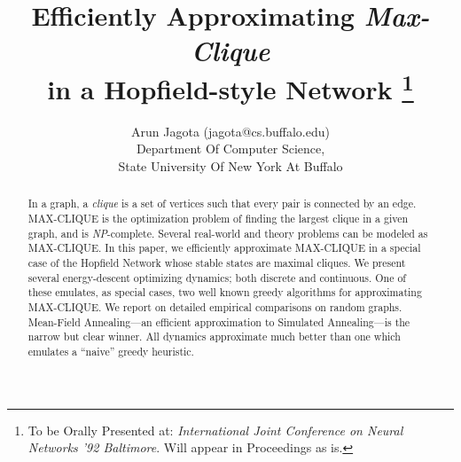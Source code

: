 \topmargin -1.0in
\textheight 9.7in
\textwidth 7.0in
\hoffset -1.0in
\title{\bf Efficiently Approximating {\em Max-Clique} \\ 
in a Hopfield-style Network 
\footnote{To be Orally Presented at: {\em International Joint Conference on Neural Networks '92 Baltimore}. Will appear in Proceedings as is.}
}
\author{Arun Jagota (jagota@cs.buffalo.edu)\\ 
Department Of Computer Science,\\
State University Of New York At Buffalo 
}
\date{}

\maketitle
\begin{abstract}
In a graph, a {\em clique} is a set of vertices such that every pair
is connected by an edge. MAX-CLIQUE is the optimization problem of 
finding the largest clique in a given graph, and is {\em NP}-complete.
Several real-world and theory problems can be modeled as MAX-CLIQUE.
In this paper, we efficiently approximate MAX-CLIQUE in a special case 
of the Hopfield Network whose stable states are maximal cliques. 
We present several energy-descent optimizing 
dynamics; both discrete and continuous. One of these
emulates, as special cases, two well known greedy algorithms for approximating 
MAX-CLIQUE. We report on detailed 
empirical comparisons on random graphs. Mean-Field Annealing---an efficient approximation
to Simulated Annealing---is the narrow but clear winner. 
All dynamics approximate much better than one which emulates
a ``naive'' greedy heuristic.
\end{abstract}
\newtheorem{theorem}{Theorem}
\newtheorem{lemma}{Lemma}
\newtheorem{defn}{Definition}
\newtheorem{corollary}{Corollary}
\newtheorem{remark}{Remark}
\newtheorem{conjecture}{Conjecture}
\newtheorem{fact}{Fact}
\newtheorem{NEG}{Negative Result}

